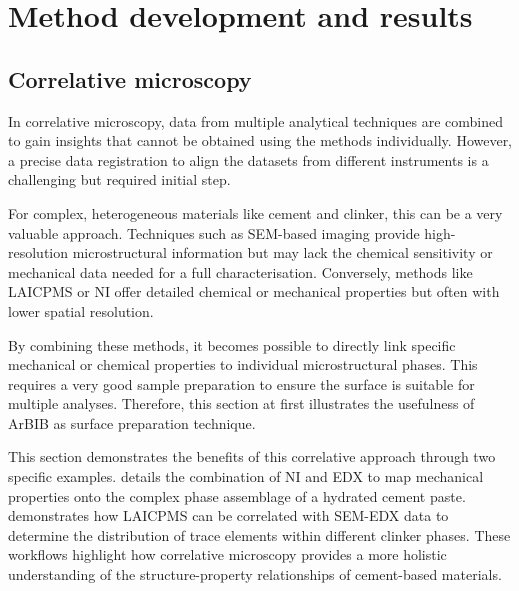 \chapter{Method development and results}

\section{Correlative microscopy}

In correlative microscopy, data from multiple analytical techniques are combined to gain insights that cannot be obtained using the methods individually.
However, a precise data registration to align the datasets from different instruments is a challenging but required initial step.

For complex, heterogeneous materials like cement and clinker, this can be a very valuable approach.
Techniques such as \ac{SEM}-based imaging provide high-resolution microstructural information but may lack the chemical sensitivity or mechanical data needed for a full characterisation.
Conversely, methods like \ac{LAICPMS} or \ac{NI} offer detailed chemical or mechanical properties but often with lower spatial resolution.

By combining these methods, it becomes possible to directly link specific mechanical or chemical properties to individual microstructural phases.
This requires a very good sample preparation to ensure the surface is suitable for multiple analyses.
Therefore, this section at first illustrates the usefulness of \ac{ArBIB} as surface preparation technique. 

This section demonstrates the benefits of this correlative approach through two specific examples.
 details the combination of \ac{NI} and \ac{EDX} to map mechanical properties onto the complex phase assemblage of a hydrated cement paste.
 demonstrates how \ac{LAICPMS} can be correlated with \ac{SEM}-\ac{EDX} data to determine the distribution of trace elements within different clinker phases.
These workflows highlight how correlative microscopy provides a more holistic understanding of the structure-property relationships of cement-based materials.
